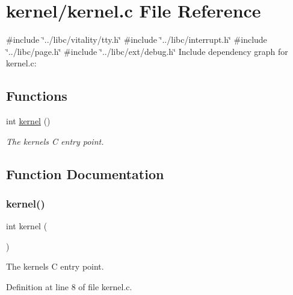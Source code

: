 \hypertarget{a00014}{}\section{kernel/kernel.c File Reference}
\label{a00014}
{\ttfamily \#include \char`\"{}../libc/vitality/tty.\+h\char`\"{}}\newline
{\ttfamily \#include \char`\"{}../libc/interrupt.\+h\char`\"{}}\newline
{\ttfamily \#include \char`\"{}../libc/page.\+h\char`\"{}}\newline
{\ttfamily \#include \char`\"{}../libc/ext/debug.\+h\char`\"{}}\newline
Include dependency graph for kernel.\+c\+:
\subsection*{Functions}
\begin{DoxyCompactItemize}
\item 
int \hyperlink{a00014_a4ee3d1f05046b7afc6b4d516bf10667a_a4ee3d1f05046b7afc6b4d516bf10667a}{kernel} ()
\begin{DoxyCompactList}\small\item\em The kernels C entry point. \end{DoxyCompactList}\end{DoxyCompactItemize}


\subsection{Function Documentation}
\mbox{\label{a00014_a4ee3d1f05046b7afc6b4d516bf10667a_a4ee3d1f05046b7afc6b4d516bf10667a}} 
\subsubsection{\texorpdfstring{kernel()}{kernel()}}
{\footnotesize\ttfamily int kernel (\begin{DoxyParamCaption}{ }\end{DoxyParamCaption})}



The kernels C entry point. 



Definition at line 8 of file kernel.\+c.


